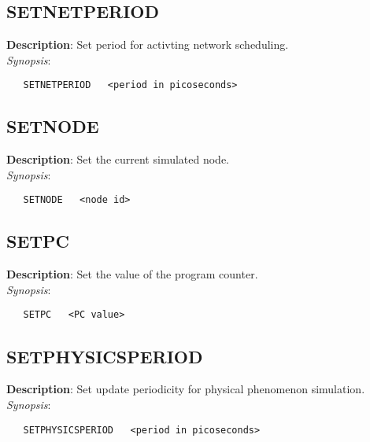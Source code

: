 \subsection{\bf SETNETPERIOD}
\label{manpages:SETNETPERIOD}
\label{manpages:setnetperiod}
\vspace{-0.2in}
{\bf Description}: 	Set period for activting network scheduling.\\[1.5ex]
{\em Synopsis}:
\vspace{-0.2in}
\scriptsize
\begin{verbatim}
   SETNETPERIOD   <period in picoseconds>	
\end{verbatim}
\normalsize
\vspace{-0.2in}


\subsection{\bf SETNODE}
\label{manpages:SETNODE}
\label{manpages:setnode}
\vspace{-0.2in}
{\bf Description}: 	Set the current simulated node.\\[1.5ex]
{\em Synopsis}:
\vspace{-0.2in}
\scriptsize
\begin{verbatim}
   SETNODE   <node id>				
\end{verbatim}
\normalsize
\vspace{-0.2in}


\subsection{\bf SETPC}
\label{manpages:SETPC}
\label{manpages:setpc}
\vspace{-0.2in}
{\bf Description}: 	Set the value of the program counter.\\[1.5ex]
{\em Synopsis}:
\vspace{-0.2in}
\scriptsize
\begin{verbatim}
   SETPC   <PC value>			
\end{verbatim}
\normalsize
\vspace{-0.2in}


\subsection{\bf SETPHYSICSPERIOD}
\label{manpages:SETPHYSICSPERIOD}
\label{manpages:setphysicsperiod}
\vspace{-0.2in}
{\bf Description}: 	Set update periodicity for physical phenomenon simulation.\\[1.5ex]
{\em Synopsis}:
\vspace{-0.2in}
\scriptsize
\begin{verbatim}
   SETPHYSICSPERIOD   <period in picoseconds> 
\end{verbatim}
\normalsize
\vspace{-0.2in}


